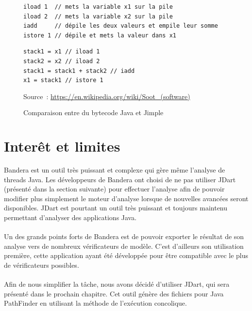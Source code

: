 \begin{figure}[ht]
  \centering
  \begin{framed}
\begin{verbatim}
iload 1  // mets la variable x1 sur la pile
iload 2  // mets la variable x2 sur la pile
iadd     // dépile les deux valeurs et empile leur somme
istore 1 // dépile et mets la valeur dans x1
\end{verbatim}
  \end{framed}

  \begin{framed}
\begin{verbatim}
stack1 = x1 // iload 1
stack2 = x2 // iload 2
stack1 = stack1 + stack2 // iadd
x1 = stack1 // istore 1
\end{verbatim}
  \end{framed}
  \caption{\label{fig:jimple_ex} Comparaison entre du bytecode Java et Jimple}
  Source~: \url{https://en.wikipedia.org/wiki/Soot_(software)}
\end{figure}


\section{Interêt et limites}

\paragraph{}
Bandera est un outil très puissant et complexe qui gère même l'analyse
de threads Java. Les développeurs de Bandera ont choisi de ne pas
utiliser JDart (présenté dans la section suivante) pour effectuer
l'analyse afin de pouvoir modifier plus simplement le moteur d'analyse
lorsque de nouvelles avancées seront disponibles. JDart est pourtant
un outil très puissant et toujours maintenu permettant d'analyser des
applications Java.

\paragraph{}
Un des grands points forts de Bandera est de pouvoir exporter le
résultat de son analyse vers de nombreux vérificateurs de
modèle. C'est d'ailleurs son utilisation première, cette application
ayant été développée pour être compatible avec le plus de
vérificateurs possibles.

\paragraph{}
Afin de nous simplifier la tâche, nous avons décidé d'utiliser JDart,
qui sera présenté dans le prochain chapitre. Cet outil génère des
fichiers pour Java PathFinder en utilisant la méthode de l'exécution
concolique.

